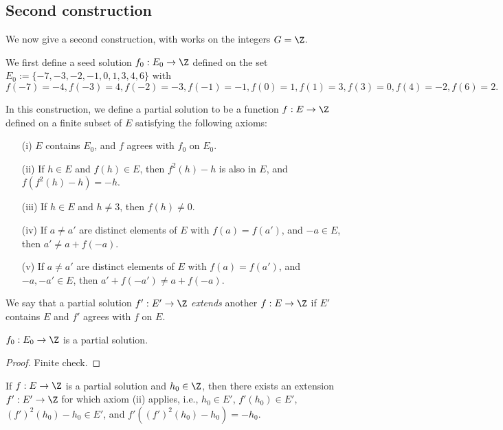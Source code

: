 \subsection{Second construction}

We now give a second construction, with works on the integers $G = \Z$.

We first define a seed solution $f_0: E_0 \to \Z$ defined on the set $E_0 := \{-7, -3, -2, -1, 0, 1, 3, 4, 6 \}$ with
$$ f(-7)=-4, f(-3) = 4, f(-2)=-3, f(-1)=-1, f(0) = 1, f(1) = 3, f(3)=0, f(4) = -2, f(6) = 2.$$

In this construction, we define a partial solution to be a function $f: E \to \Z$ defined on a finite subset of $E$ satisfying the following axioms:
\begin{itemize}
\item[(i)] $E$ contains $E_0$, and $f$ agrees with $f_0$ on $E_0$.
\item[(ii)] If $h \in E$ and $f(h) \in E$, then $f^2(h)-h$ is also in $E$, and $f(f^2(h)-h) = -h$.
\item[(iii)] If $h \in E$ and $h \neq 3$, then $f(h) \neq 0$.
\item[(iv)]  If $a \neq a'$ are distinct elements of $E$ with $f(a)=f(a')$, and $-a \in E$, then $a' \neq a + f(-a)$.
\item[(v)]  If $a \neq a'$ are distinct elements of $E$ with $f(a)=f(a')$, and $-a, -a' \in E$, then $a' + f(-a') \neq a + f(-a)$.
\end{itemize}
We say that a partial solution $f': E' \to \Z$ \emph{extends} another $f: E \to \Z$ if $E'$ contains $E$ and $f'$ agrees with $f$ on $E$.

\begin{lemma}\label{finite-check} $f_0: E_0 \to \Z$ is a partial solution.
\end{lemma}

\begin{proof} Finite check.
\end{proof}

\begin{lemma}[Extension]\label{extension-lemma}\leanok{} If $f: E \to \Z$ is a partial solution and $h_0 \in \Z$, then there exists an extension $f': E' \to \Z$ for which axiom (ii) applies, i.e., $h_0 \in E'$, $f'(h_0) \in E'$, $(f')^2(h_0)-h_0 \in E'$, and $f'((f')^2(h_0)-h_0) = -h_0$.
\end{lemma}

